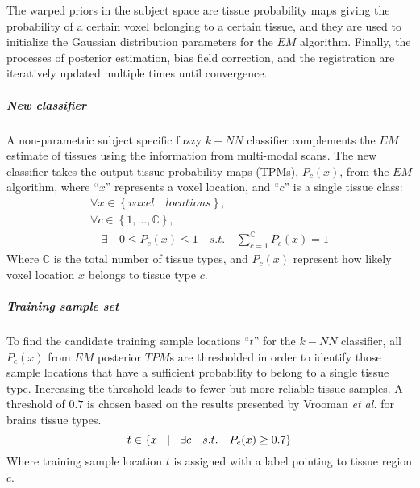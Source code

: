 The warped priors in the subject space are tissue probability maps giving the probability of a certain voxel belonging to a certain tissue, and they are used to initialize the Gaussian distribution parameters for the $EM$ algorithm. Finally, the processes of posterior estimation, bias field correction, and the registration are iteratively updated multiple times until convergence.

\subparagraph{New classifier} %

A non-parametric subject specific fuzzy $k-NN$ classifier complements the $EM$ estimate of tissues using the information from multi-modal scans. The new classifier takes the output tissue probability maps (TPMs), $P_{c}(x)$, from the $EM$ algorithm, where ``$x$'' represents a voxel location, and ``$c$'' is a single tissue class:
\begin{equation}
\begin{gathered}
\forall x\in \left\{voxel \quad locations\right\}, \\
\forall c\in \left\{1,\ldots, \mathbb{C}\right\}, \\
\quad \exists \quad 0 \leq P_c(x) \leq 1 \quad s.t. \quad
\sum^{\mathbb{C}}_{c=1}P_c(x)=1
\end{gathered}
\end{equation}
Where $\mathbb{C}$ is the total number of tissue types, and $P_{c}(x)$ represent how likely voxel location $x$ belongs to tissue type $c$.

\subparagraph*{Training sample set} %

To find the candidate training sample locations ``$t$'' for the $k-NN$ classifier, all $P_c(x)$ from $EM$ posterior $TPM$s are thresholded in order to identify those sample locations that have a sufficient probability to belong to a single tissue type. Increasing the threshold leads to fewer but more reliable tissue samples. A threshold of $0.7$ is chosen based on the results presented by Vrooman \emph{et al.}\cite{Vrooman2007} for brains tissue types.
\begin{equation}
t\in \left\{ x\quad \vline \quad \exists c \quad s.t. \quad P_c(x)\geq 0.7\right\}
\end{equation}
Where training sample location $t$ is assigned with a label pointing to tissue region $c$.

